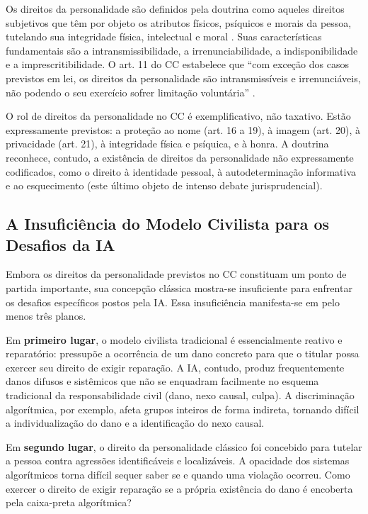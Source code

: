 Os direitos da personalidade são definidos pela doutrina como aqueles direitos subjetivos que têm por objeto os atributos físicos, psíquicos e morais da pessoa, tutelando sua integridade física, intelectual e moral \cite{Amaral2003DBC}. Suas características fundamentais são a intransmissibilidade, a irrenunciabilidade, a indisponibilidade e a imprescritibilidade. O art. 11 do CC estabelece que ``com exceção dos casos previstos em lei, os direitos da personalidade são intransmissíveis e irrenunciáveis, não podendo o seu exercício sofrer limitação voluntária'' \cite{Brasil2002CC}.

O rol de direitos da personalidade no CC é exemplificativo, não taxativo. Estão expressamente previstos: a proteção ao nome (art. 16 a 19), à imagem (art. 20), à privacidade (art. 21), à integridade física e psíquica, e à honra. A doutrina reconhece, contudo, a existência de direitos da personalidade não expressamente codificados, como o direito à identidade pessoal, à autodeterminação informativa e ao esquecimento (este último objeto de intenso debate jurisprudencial).

\subsection{A Insuficiência do Modelo Civilista para os Desafios da IA}
\label{subsec:insuficiencia-civilista}

Embora os direitos da personalidade previstos no CC constituam um ponto de partida importante, sua concepção clássica mostra-se insuficiente para enfrentar os desafios específicos postos pela IA. Essa insuficiência manifesta-se em pelo menos três planos.

Em \textbf{primeiro lugar}, o modelo civilista tradicional é essencialmente reativo e reparatório: pressupõe a ocorrência de um dano concreto para que o titular possa exercer seu direito de exigir reparação. A IA, contudo, produz frequentemente danos difusos e sistêmicos que não se enquadram facilmente no esquema tradicional da responsabilidade civil (dano, nexo causal, culpa). A discriminação algorítmica, por exemplo, afeta grupos inteiros de forma indireta, tornando difícil a individualização do dano e a identificação do nexo causal.

Em \textbf{segundo lugar}, o direito da personalidade clássico foi concebido para tutelar a pessoa contra agressões identificáveis e localizáveis. A opacidade dos sistemas algorítmicos torna difícil sequer saber se e quando uma violação ocorreu. Como exercer o direito de exigir reparação se a própria existência do dano é encoberta pela caixa-preta algorítmica?

